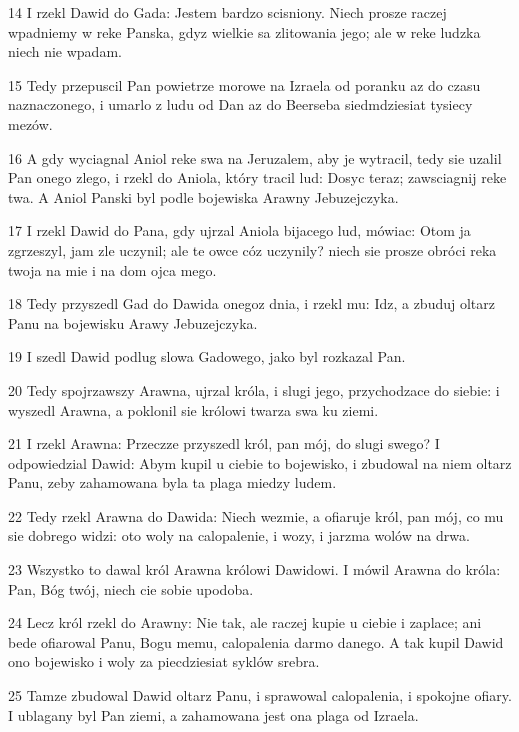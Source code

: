 \par 14 I rzekl Dawid do Gada: Jestem bardzo scisniony. Niech prosze raczej wpadniemy w reke Panska, gdyz wielkie sa zlitowania jego; ale w reke ludzka niech nie wpadam.
\par 15 Tedy przepuscil Pan powietrze morowe na Izraela od poranku az do czasu naznaczonego, i umarlo z ludu od Dan az do Beerseba siedmdziesiat tysiecy mezów.
\par 16 A gdy wyciagnal Aniol reke swa na Jeruzalem, aby je wytracil, tedy sie uzalil Pan onego zlego, i rzekl do Aniola, który tracil lud: Dosyc teraz; zawsciagnij reke twa. A Aniol Panski byl podle bojewiska Arawny Jebuzejczyka.
\par 17 I rzekl Dawid do Pana, gdy ujrzal Aniola bijacego lud, mówiac: Otom ja zgrzeszyl, jam zle uczynil; ale te owce cóz uczynily? niech sie prosze obróci reka twoja na mie i na dom ojca mego.
\par 18 Tedy przyszedl Gad do Dawida onegoz dnia, i rzekl mu: Idz, a zbuduj oltarz Panu na bojewisku Arawy Jebuzejczyka.
\par 19 I szedl Dawid podlug slowa Gadowego, jako byl rozkazal Pan.
\par 20 Tedy spojrzawszy Arawna, ujrzal króla, i slugi jego, przychodzace do siebie: i wyszedl Arawna, a poklonil sie królowi twarza swa ku ziemi.
\par 21 I rzekl Arawna: Przeczze przyszedl król, pan mój, do slugi swego? I odpowiedzial Dawid: Abym kupil u ciebie to bojewisko, i zbudowal na niem oltarz Panu, zeby zahamowana byla ta plaga miedzy ludem.
\par 22 Tedy rzekl Arawna do Dawida: Niech wezmie, a ofiaruje król, pan mój, co mu sie dobrego widzi: oto woly na calopalenie, i wozy, i jarzma wolów na drwa.
\par 23 Wszystko to dawal król Arawna królowi Dawidowi. I mówil Arawna do króla: Pan, Bóg twój, niech cie sobie upodoba.
\par 24 Lecz król rzekl do Arawny: Nie tak, ale raczej kupie u ciebie i zaplace; ani bede ofiarowal Panu, Bogu memu, calopalenia darmo danego. A tak kupil Dawid ono bojewisko i woly za piecdziesiat syklów srebra.
\par 25 Tamze zbudowal Dawid oltarz Panu, i sprawowal calopalenia, i spokojne ofiary. I ublagany byl Pan ziemi, a zahamowana jest ona plaga od Izraela.


